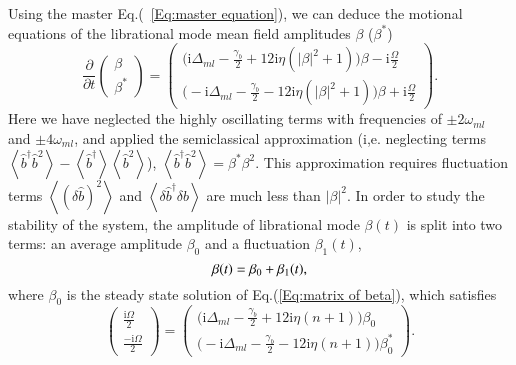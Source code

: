 \documentclass[pra,aps,superscriptaddress,showpacs,preprint]{revtex4}%
\begin{document}
Using the master Eq.(~\ref{Eq:master equation}), we can deduce the motional equations of the librational mode mean field amplitudes $\beta$ ($\beta^{*}$)
\begin{equation}
\frac{\partial}{\partial t}
\begin{pmatrix}
\beta\\ \beta^{\ast}
\end{pmatrix}=
\begin{pmatrix}
\Big(\mathrm{i}\Delta_{ml}-\frac{\gamma_{b}}{2}+12\mathrm{i}\eta(|\beta|^{2}+1)\Big)\beta-\mathrm{i}\frac{\Omega}{2}\\
\Big(-\mathrm{i}\Delta_{ml}-\frac{\gamma_{b}}{2}-12\mathrm{i}\eta(|\beta|^{2}+1)\Big)\beta+\mathrm{i}\frac{\Omega}{2}
\end{pmatrix}
\label{Eq:matrix of beta}.
\end{equation}
Here we have neglected the highly oscillating terms with frequencies of $\pm 2\omega_{ml}$ and $\pm4\omega_{ml}$, and applied the semiclassical approximation (i,e. neglecting terms $\left\langle\hat{b}^{\dag}\hat{b}^{2}\right\rangle-\left\langle \hat{b}^{\dag}\right\rangle\left\langle\hat{b}^{2}\right\rangle$), $\left\langle \hat{b}^{\dag}\hat{b}^{2}\right\rangle=\beta^{\ast}\beta^{2}$. This approximation requires fluctuation terms $\left\langle(\delta\hat{b})^{2}\right\rangle$ and $\left\langle\delta\hat{b}^{\dag}\delta\hat{b}\right\rangle$ are much less than $|\beta|^2$.
In order to study the stability of the system, the amplitude of librational mode $\beta(t)$ is split into two terms: an average amplitude $\beta_{0}$ and a fluctuation $\beta_{1}(t)$,
 \begin{equation}
 \beta(t)=\beta_{0}+\beta_{1}(t)
 \label{Eq:{steady and fluctuation}},
 \end{equation}
where $\beta_{0}$ is the steady state solution of Eq.(\ref{Eq:matrix of beta}), which satisfies
 \begin{equation}
   \begin{pmatrix}
    \frac{\mathrm{i}\Omega}{2}\\\frac{-\mathrm{i}\Omega}{2}
     \end{pmatrix}
     =
    \begin{pmatrix}
\Big(\mathrm{i}\Delta_{ml}-\frac{\gamma_{b}}{2}+12\mathrm{i}\eta(n+1)\Big)\beta_{0}\\
\Big(-\mathrm{i}\Delta_{ml}-\frac{\gamma_{b}}{2}-12\mathrm{i}\eta(n+1)\Big)\beta_{0}^{\ast}
   \end{pmatrix}.
   \label{Eq:steady state equation}
 \end{equation}
\end{document}
